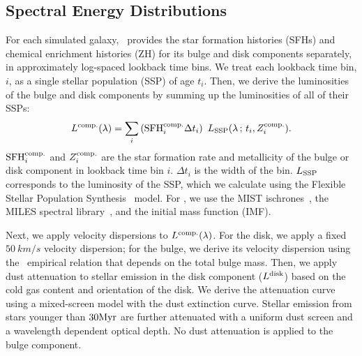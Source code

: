 
\subsection{Spectral Energy Distributions} \label{sec:sed}
For each simulated galaxy, \lgal~provides the star formation histories (SFHs)
and chemical enrichment histories (ZH) for its bulge and disk components
separately, in approximately log-spaced lookback time bins. %
We treat each lookback time bin, $i$, as a single stellar population (SSP) of
age $t_i$.
Then, we derive the luminosities of the bulge and disk components by summing up
the luminosities of all of their SSPs:
\begin{equation}
    L^{\rm comp.}(\lambda) = \sum \limits_i \left({\rm SFH}^{\rm comp.}_i
    \Delta t_i\right)~L_{\rm SSP}(\lambda\,;\, t_i, Z^{\rm comp.}_i). 
\end{equation}
${\rm SFH}^{\rm comp.}_i$ and $Z^{\rm comp.}_i$ are the star formation rate and
metallicity of the bulge or disk component in lookback time bin $i$. 
$\Delta t_i$ is the width of the bin. 
$L_{\rm SSP}$ corresponds to the luminosity of the SSP, which we calculate
using the Flexible Stellar Population Synthesis~\citep[\fsps][]{conroy2009,
conroy2010c} model.
For \fsps, we use the MIST ischrones~\citep{paxton2011, paxton2013, paxton2015,
choi2016, dotter2016}, the MILES spectral library~\citep{sanchez-blazquez2006},
and the \cite{chabrier2003} initial mass function (IMF). 

Next, we apply velocity dispersions to $L^{\rm comp.}(\lambda)$.
For the disk, we apply a fixed $50~km/s$ velocity dispersion; for the bulge, we
derive its velocity dispersion using the~\cite{zahid2016} empirical relation
that depends on the total bulge mass.
Then, we apply dust attenuation to stellar emission in the disk component
($L^{\rm disk}$) based on the cold gas content and orientation of the disk. 
We derive the attenuation curve using a mixed-screen model with the
\cite{mathis1983} dust extinction curve. 
Stellar emission from stars younger than $30{\rm Myr}$ are further attenuated
with a uniform dust screen and a wavelength dependent optical depth.
No dust attenuation is applied to the bulge component.

